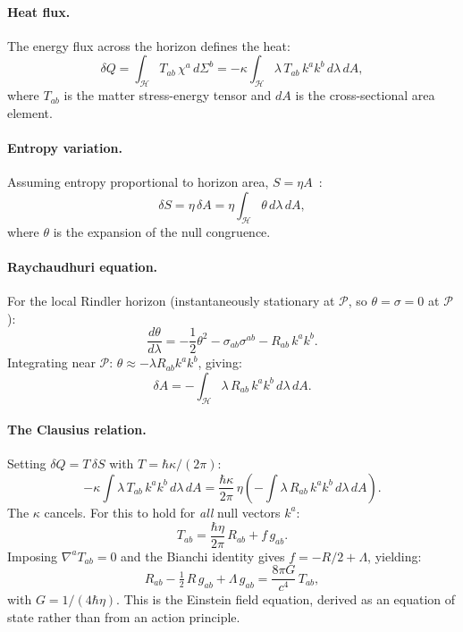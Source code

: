 \documentclass[twocolumn,a4paper,aps,prd,twocolumn,showpacs,notitlepage,superscriptaddress,nofootinbib]{article}
\begin{document}
\paragraph{Heat flux.}
The energy flux across the horizon defines the heat:
\begin{equation}
\delta Q = \int_{\mathcal{H}} T_{ab}\,\chi^a\,d\Sigma^b
= -\kappa \int_{\mathcal{H}} \lambda\,T_{ab}\,k^a k^b\,d\lambda\,dA,
\label{eq:heat_flux}
\end{equation}
where $T_{ab}$ is the matter stress-energy tensor and $dA$ is the
cross-sectional area element.

\paragraph{Entropy variation.}
Assuming entropy proportional to horizon area, $S = \eta A$~\citep{Bekenstein1973}:
\begin{equation}
\delta S = \eta\,\delta A = \eta \int_{\mathcal{H}} \theta\,d\lambda\,dA,
\label{eq:dS_jacobson}
\end{equation}
where $\theta$ is the expansion of the null congruence.

\paragraph{Raychaudhuri equation.}
For the local Rindler horizon (instantaneously stationary at $\mathcal{P}$,
so $\theta = \sigma = 0$ at $\mathcal{P}$):
\begin{equation}
\frac{d\theta}{d\lambda} = -\frac{1}{2}\theta^2
  - \sigma_{ab}\sigma^{ab} - R_{ab}\,k^a k^b.
\label{eq:raychaudhuri}
\end{equation}
Integrating near $\mathcal{P}$: $\theta \approx -\lambda R_{ab}k^a k^b$,
giving:
\begin{equation}
\delta A = -\int_{\mathcal{H}} \lambda\,R_{ab}\,k^a k^b\,d\lambda\,dA.
\label{eq:dA}
\end{equation}

\paragraph{The Clausius relation.}
Setting $\delta Q = T\,\delta S$ with $T = \hbar\kappa/(2\pi)$:
\begin{equation}
-\kappa \int \lambda\,T_{ab}\,k^a k^b\,d\lambda\,dA
= \frac{\hbar\kappa}{2\pi}\,\eta
\left(-\int \lambda\,R_{ab}\,k^a k^b\,d\lambda\,dA\right).
\end{equation}
The $\kappa$ cancels.  For this to hold for \textit{all} null vectors $k^a$:
\begin{equation}
T_{ab} = \frac{\hbar\eta}{2\pi}\,R_{ab} + f\,g_{ab}.
\end{equation}
Imposing $\nabla^a T_{ab} = 0$ and the Bianchi identity gives
$f = -R/2 + \Lambda$, yielding:
\begin{equation}
R_{ab} - \tfrac{1}{2}\,R\,g_{ab} + \Lambda\,g_{ab}
= \frac{8\pi G}{c^4}\,T_{ab},
\label{eq:einstein}
\end{equation}
with $G = 1/(4\hbar\eta)$.  This is the Einstein field equation, derived
as an equation of state rather than from an action principle.
\end{document}
